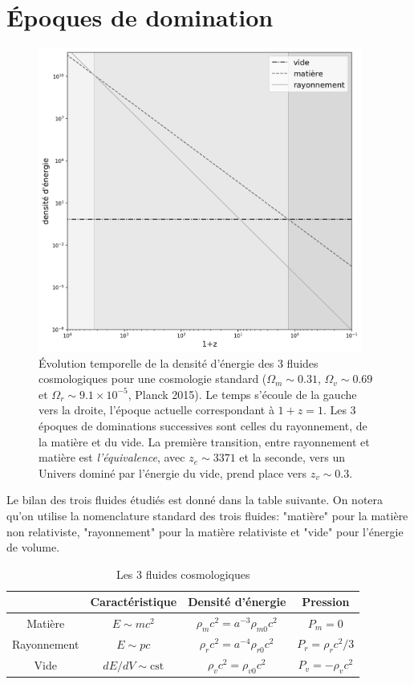 \section{Époques de domination}
\begin{figure}[htbp]
	\centering
		\includegraphics[height=10cm]{figs/era.png}
	\caption[Époques de domination des fluides cosmiques]{Évolution temporelle de la densité d'énergie des 3 fluides cosmologiques pour une cosmologie standard ($\Omega_m \sim 0.31$, $\Omega_v \sim 0.69$ et $\Omega_r\sim 9.1\times 10^{-5}$, Planck 2015). Le temps s'écoule de la gauche vers la droite, l'époque actuelle correspondant à $1+z=1$. Les 3 époques de dominations successives sont celles du rayonnement, de la matière et du vide. La première transition, entre rayonnement et matière est \textit{ l'équivalence}, avec $z_e\sim 3371$ et la seconde, vers un Univers dominé par l'énergie du vide, prend place vers $z_v \sim 0.3$. }
	\label{f:era}
\end{figure}
Le bilan des trois fluides étudiés est donné dans la table suivante. On notera qu'on utilise la nomenclature standard des trois fluides: "matière" pour la matière non relativiste, "rayonnement" pour la matière relativiste et "vide" pour l'énergie de volume.
\begin{table}[h]
\begin{center}
\begin{tabular}{|c|c|c|c|}
\hline 
 & Caractéristique & Densité d'énergie & Pression \\ 
\hline 
Matière & $E\sim mc^2$ & $\rho_mc^2 =a^{-3}\rho_{m0}c^2$& $P_m=0$\\ 
\hline 
Rayonnement & $E\sim pc$ & $\rho_rc^2 =a^{-4}\rho_{r0}c^2$ & $P_r=\rho_rc^2/3$ \\ 
\hline 
Vide & $dE/dV\sim \mathrm{cst}$ & $\rho_vc^2 =\rho_{v0}c^2$ & $P_v=-\rho_vc^2$ \\ 
\hline 
\end{tabular} 
\end{center}
\caption{Les 3 fluides cosmologiques}
\end{table}

